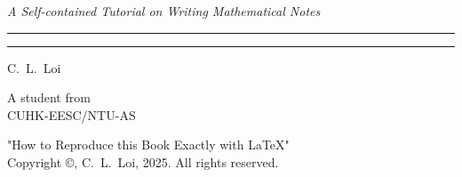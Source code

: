 \begin{titlepage}
\parbox{0.7\textwidth}{\Huge\raggedright\textbf{}}\par
\vspace{2mm}
\parbox[b]{0.9\textwidth}{\large\raggedright\textit{A Self-contained Tutorial on Writing Mathematical Notes}}
\hfill\textcolor{RoyalBlue}{\rule{3mm}{3mm}}\par
\vspace{4mm}\hrule\par
{\Large\raggedleft{}\hfill C.~L.~Loi\par}
\vfill
{\large\raggedleft A student from \\ 
CUHK-EESC/NTU-AS\par}
\end{titlepage}
\thispagestyle{empty}
\vspace*{\fill}
"How to Reproduce this Book Exactly with \LaTeX"\\
Copyright ©, C.~L.~Loi, 2025. All rights reserved.
\tableofcontents